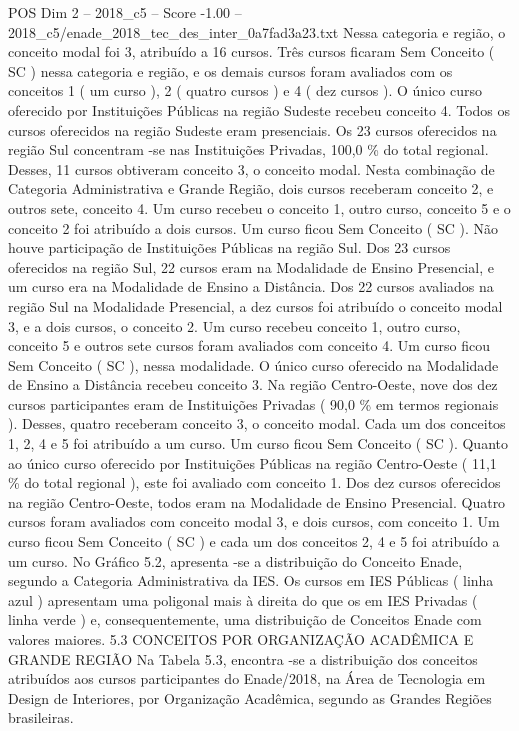 \begin{textsample}{POS Dim 2 – 2018\_c5 – Score -1.00 – 2018\_c5/enade\_2018\_tec\_des\_inter\_0a7fad3a23.txt}
Nessa categoria e região, o conceito modal foi 3, atribuído a 16 cursos.
Três cursos ficaram Sem Conceito ( SC ) nessa categoria e região, e os demais cursos foram avaliados com os conceitos 1 ( um curso ), 2 ( quatro cursos ) e 4 ( dez cursos ).
O único curso oferecido por Instituições Públicas na região Sudeste recebeu conceito 4.
Todos os cursos oferecidos na região Sudeste eram presenciais.
Os 23 cursos oferecidos na região Sul concentram -se nas Instituições Privadas, 100,0 \% do total regional.
Desses, 11 cursos obtiveram conceito 3, o conceito modal.
Nesta combinação de Categoria Administrativa e Grande Região, dois cursos receberam conceito 2, e outros sete, conceito 4.
Um curso recebeu o conceito 1, outro curso, conceito 5 e o conceito 2 foi atribuído a dois cursos.
Um curso ficou Sem Conceito ( SC ).
Não houve participação de Instituições Públicas na região Sul.
Dos 23 cursos oferecidos na região Sul, 22 cursos eram na Modalidade de Ensino Presencial, e um curso era na Modalidade de Ensino a Distância.
Dos 22 cursos avaliados na região Sul na Modalidade Presencial, a dez cursos foi atribuído o conceito modal 3, e a dois cursos, o conceito 2.
Um curso recebeu conceito 1, outro curso, conceito 5 e outros sete cursos foram avaliados com conceito 4.
Um curso ficou Sem Conceito ( SC ), nessa modalidade.
O único curso oferecido na Modalidade de Ensino a Distância recebeu conceito 3.
Na região Centro-Oeste, nove dos dez cursos participantes eram de Instituições Privadas ( 90,0 \% em termos regionais ).
Desses, quatro receberam conceito 3, o conceito modal.
Cada um dos conceitos 1, 2, 4 e 5 foi atribuído a um curso.
Um curso ficou Sem Conceito ( SC ).
Quanto ao único curso oferecido por Instituições Públicas na região Centro-Oeste ( 11,1 \% do total regional ), este foi avaliado com conceito 1.
Dos dez cursos oferecidos na região Centro-Oeste, todos eram na Modalidade de Ensino Presencial.
Quatro cursos foram avaliados com conceito modal 3, e dois cursos, com conceito 1.
Um curso ficou Sem Conceito ( SC ) e cada um dos conceitos 2, 4 e 5 foi atribuído a um curso.
No Gráfico 5.2, apresenta -se a distribuição do Conceito Enade, segundo a Categoria Administrativa da IES.
Os cursos em IES Públicas ( linha azul ) apresentam uma poligonal mais à direita do que os em IES Privadas ( linha verde ) e, consequentemente, uma distribuição de Conceitos Enade com valores maiores. 5.3 CONCEITOS POR ORGANIZAÇÃO ACADÊMICA E GRANDE REGIÃO Na Tabela 5.3, encontra -se a distribuição dos conceitos atribuídos aos cursos participantes do Enade/2018, na Área de Tecnologia em Design de Interiores, por Organização Acadêmica, segundo as Grandes Regiões brasileiras.

\end{textsample}
